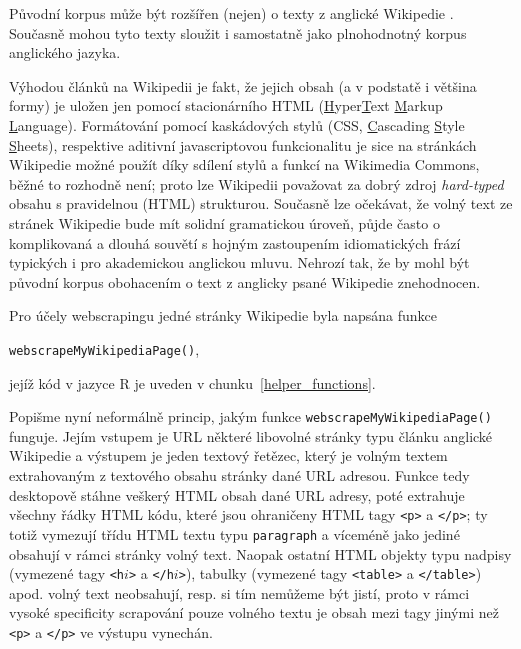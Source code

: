 Původní korpus může být rozšířen (nejen) o texty z anglické Wikipedie%
.
Současně mohou tyto texty sloužit i samostatně jako plnohodnotný korpus
anglického jazyka.

Výhodou článků na Wikipedii je fakt, že jejich obsah (a
v podstatě i většina
formy) je uložen jen pomocí stacionárního HTML
(\underline{H}yper\underline{T}ext \underline{M}arkup \underline{L}anguage).
Formátování pomocí kaskádových stylů (CSS, \underline{C}ascading
\underline{S}tyle \underline{S}heets), respektive aditivní
javascriptovou funkcionalitu je sice na stránkách Wikipedie%
 možné použít
díky sdílení stylů a funkcí na Wikimedia Commons, běžné to rozhodně není;
proto lze Wikipedii považovat za dobrý zdroj
\textit{hard-typed} obsahu s pravidelnou (HTML) strukturou.
Současně lze očekávat, že volný text ze stránek Wikipedie%
 bude mít solidní
gramatickou úroveň, půjde často o komplikovaná a dlouhá souvětí s hojným
zastoupením idiomatických frází typických i pro akademickou anglickou mluvu.
Nehrozí tak, že by mohl být původní korpus obohacením o text z anglicky
psané Wikipedie znehodnocen.

Pro účely webscrapingu jedné stránky Wikipedie%
 byla napsána funkce

\begin{center}
\texttt{webscrapeMyWikipediaPage()},
\end{center}

jejíž kód v jazyce \textsf{R} je uveden v chunku~\ref{helper_functions}.

Popišme nyní neformálně princip, jakým funkce
\texttt{webscrapeMyWikipediaPage()} funguje. Jejím vstupem je URL některé libovolné
stránky typu článku anglické Wikipedie a výstupem je jeden textový řetězec,
který je volným textem extrahovaným z textového obsahu stránky dané URL
adresou. Funkce tedy desktopově stáhne veškerý HTML obsah dané URL adresy,
poté extrahuje všechny řádky HTML kódu, které jsou ohraničeny HTML tagy
\texttt{<p>} a \texttt{</p>}; ty totiž vymezují třídu HTML textu typu
\texttt{paragraph} a víceméně jako jediné obsahují v rámci stránky
volný text. Naopak ostatní HTML objekty typu nadpisy (vymezené tagy
\texttt{<h$i$>} a \texttt{</h$i$>}), tabulky (vymezené tagy \texttt{<table>}
a \texttt{</table>}) apod. volný text neobsahují, resp. si tím nemůžeme
být jistí, proto v rámci vysoké specificity scrapování pouze volného
textu je obsah mezi tagy jinými než \texttt{<p>} a \texttt{</p>} ve výstupu
vynechán.

